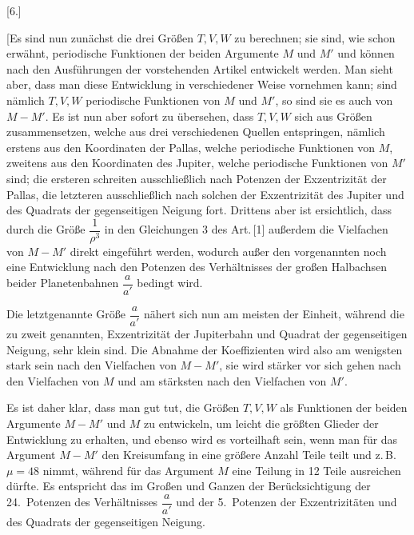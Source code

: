 \clearpage
\begin{landscape}
\begingroup
\fontsize{10}{13}\selectfont
{}
\renewcommand{\headrulewidth}{0pt}
\newcommand{\VSixPoint}{\mathord{.}\mkern5mu}
\newcommand{\VSixTenPoints}{\VSixPoint\VSixPoint\VSixPoint\VSixPoint\VSixPoint\VSixPoint\VSixPoint\VSixPoint\VSixPoint\VSixPoint}
\begin{center}[6.]\end{center}
\par\noindent\hspace*{\parindent}[Es sind nun zunächst die drei Größen \(T,V,W\) zu berechnen; sie sind, wie schon erwähnt, periodische Funktionen der beiden Argumente \(M\) und \(M'\) und können nach den Ausführungen der vorstehenden Artikel entwickelt werden. Man sieht aber, dass man diese Entwicklung in verschiedener Weise vornehmen kann; sind nämlich \(T,V,W\) periodische Funktionen von \(M\) und \(M'\), so sind sie es auch von \(M-M'\). Es ist nun aber sofort zu übersehen, dass \(T,V,W\) sich aus Größen zusammensetzen, welche aus drei verschiedenen Quellen entspringen, nämlich erstens aus den Koordinaten der Pallas, welche periodische Funktionen von \(M\), zweitens aus den Koordinaten des Jupiter, welche periodische Funktionen von \(M'\) sind; die ersteren schreiten ausschließlich nach Potenzen der Exzentrizität der Pallas, die letzteren ausschließlich nach solchen der Exzentrizität des Jupiter und des Quadrats der gegenseitigen Neigung fort. Drittens aber ist ersichtlich, dass durch die Größe \(\dfrac{1}{\rho^3}\) in den Gleichungen 3 des Art.\,[1] außerdem die Vielfachen von \(M-M'\) direkt eingeführt werden, wodurch außer den vorgenannten noch eine Entwicklung nach den Potenzen des Verhältnisses der großen Halbachsen beider Planetenbahnen \(\dfrac{a}{a'}\) bedingt wird.
\par\noindent\hspace*{\parindent}Die letztgenannte Größe \(\dfrac{a}{a'}\) nähert sich nun am meisten der Einheit, während die zu zweit genannten, Exzentrizität der Jupiterbahn und Quadrat der gegenseitigen Neigung, sehr klein sind. Die Abnahme der Koeffizienten wird also am wenigsten stark sein nach den Vielfachen von \(M-M'\), sie wird stärker vor sich gehen nach den Vielfachen von \(M\) und am stärksten nach den Vielfachen von \(M'\).
\par\noindent\hspace*{\parindent}Es ist daher klar, dass man gut tut, die Größen \(T,V,W\) als Funktionen der beiden Argumente \(M-M'\) und \(M\) zu entwickeln, um leicht die größten Glieder der Entwicklung zu erhalten, und ebenso wird es vorteilhaft sein, wenn man für das Argument \(M-M'\) den Kreisumfang in eine größere Anzahl Teile teilt und z.\,B.\ \(\mu=48\) nimmt, während für das Argument \(M\) eine Teilung in 12 Teile ausreichen dürfte. Es entspricht das im Großen und Ganzen der Berücksichtigung der 24.\ Potenzen des Verhältnisses \(\dfrac{a}{a'}\) und der 5.\ Potenzen der Exzentrizitäten und des Quadrats der gegenseitigen Neigung.

\end{landscape}
